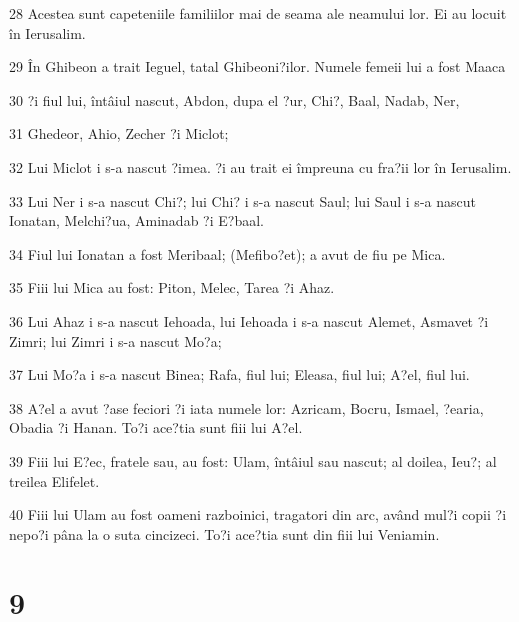 \par 28 Acestea sunt capeteniile familiilor mai de seama ale neamului lor. Ei au locuit în Ierusalim.
\par 29 În Ghibeon a trait Ieguel, tatal Ghibeoni?ilor. Numele femeii lui a fost Maaca
\par 30 ?i fiul lui, întâiul nascut, Abdon, dupa el ?ur, Chi?, Baal, Nadab, Ner,
\par 31 Ghedeor, Ahio, Zecher ?i Miclot;
\par 32 Lui Miclot i s-a nascut ?imea. ?i au trait ei împreuna cu fra?ii lor în Ierusalim.
\par 33 Lui Ner i s-a nascut Chi?; lui Chi? i s-a nascut Saul; lui Saul i s-a nascut Ionatan, Melchi?ua, Aminadab ?i E?baal.
\par 34 Fiul lui Ionatan a fost Meribaal; (Mefibo?et); a avut de fiu pe Mica.
\par 35 Fiii lui Mica au fost: Piton, Melec, Tarea ?i Ahaz.
\par 36 Lui Ahaz i s-a nascut Iehoada, lui Iehoada i s-a nascut Alemet, Asmavet ?i Zimri; lui Zimri i s-a nascut Mo?a;
\par 37 Lui Mo?a i s-a nascut Binea; Rafa, fiul lui; Eleasa, fiul lui; A?el, fiul lui.
\par 38 A?el a avut ?ase feciori ?i iata numele lor: Azricam, Bocru, Ismael, ?earia, Obadia ?i Hanan. To?i ace?tia sunt fiii lui A?el.
\par 39 Fiii lui E?ec, fratele sau, au fost: Ulam, întâiul sau nascut; al doilea, Ieu?; al treilea Elifelet.
\par 40 Fiii lui Ulam au fost oameni razboinici, tragatori din arc, având mul?i copii ?i nepo?i pâna la o suta cincizeci. To?i ace?tia sunt din fiii lui Veniamin.

\chapter{9}

